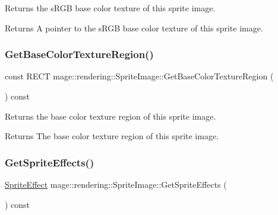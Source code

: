 Returns the s\+R\+GB base color texture of this sprite image.

\begin{DoxyReturn}{Returns}
A pointer to the s\+R\+GB base color texture of this sprite image. 
\end{DoxyReturn}
\hypertarget{classmage_1_1rendering_1_1_sprite_image_ae8d120b87e4791cf85799623ae554f41}{}\label{classmage_1_1rendering_1_1_sprite_image_ae8d120b87e4791cf85799623ae554f41} 
\subsubsection{\texorpdfstring{Get\+Base\+Color\+Texture\+Region()}{GetBaseColorTextureRegion()}}
{\footnotesize\ttfamily const R\+E\+CT mage\+::rendering\+::\+Sprite\+Image\+::\+Get\+Base\+Color\+Texture\+Region (\begin{DoxyParamCaption}{ }\end{DoxyParamCaption}) const\hspace{0.3cm}{\ttfamily [noexcept]}}

Returns the base color texture region of this sprite image.

\begin{DoxyReturn}{Returns}
The base color texture region of this sprite image. 
\end{DoxyReturn}
\hypertarget{classmage_1_1rendering_1_1_sprite_image_a82a804fe9ed8c685268a1a42ab853eb4}{}\label{classmage_1_1rendering_1_1_sprite_image_a82a804fe9ed8c685268a1a42ab853eb4} 
\subsubsection{\texorpdfstring{Get\+Sprite\+Effects()}{GetSpriteEffects()}}
{\footnotesize\ttfamily \hyperlink{namespacemage_1_1rendering_a4dbc3536c87b906f1d41d863ec458e78}{Sprite\+Effect} mage\+::rendering\+::\+Sprite\+Image\+::\+Get\+Sprite\+Effects (\begin{DoxyParamCaption}{ }\end{DoxyParamCaption}) const\hspace{0.3cm}{\ttfamily [noexcept]}}

